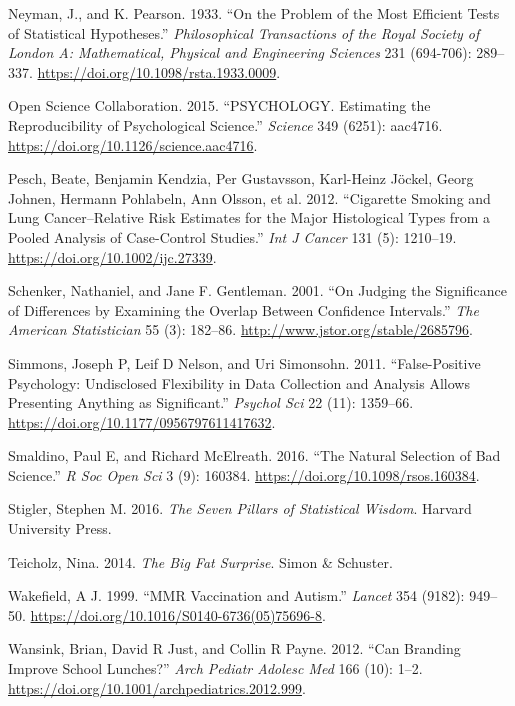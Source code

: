 \documentclass[
  12pt,
]{book}
\newlength{\cslhangindent}
\newlength{\cslentryspacingunit} %
\newenvironment{CSLReferences}[2] %
 {%
  \setlength{\parindent}{0pt}
  \ifodd #1
  \let\oldpar\par
  \def\par{\hangindent=\cslhangindent\oldpar}
  \fi
  \setlength{\parskip}{#2\cslentryspacingunit}
 }%
 {}
\begin{document}
\begin{CSLReferences}{1}{0}
\leavevmode{}%
Neyman, J., and K. Pearson. 1933. {``On the Problem of the Most Efficient Tests of Statistical Hypotheses.''} \emph{Philosophical Transactions of the Royal Society of London A: Mathematical, Physical and Engineering Sciences} 231 (694-706): 289--337. \url{https://doi.org/10.1098/rsta.1933.0009}.

\leavevmode{}%
Open Science Collaboration. 2015. {``PSYCHOLOGY. Estimating the Reproducibility of Psychological Science.''} \emph{Science} 349 (6251): aac4716. \url{https://doi.org/10.1126/science.aac4716}.

\leavevmode{}%
Pesch, Beate, Benjamin Kendzia, Per Gustavsson, Karl-Heinz Jöckel, Georg Johnen, Hermann Pohlabeln, Ann Olsson, et al. 2012. {``Cigarette Smoking and Lung Cancer--Relative Risk Estimates for the Major Histological Types from a Pooled Analysis of Case-Control Studies.''} \emph{Int J Cancer} 131 (5): 1210--19. \url{https://doi.org/10.1002/ijc.27339}.

\leavevmode{}%
Schenker, Nathaniel, and Jane F. Gentleman. 2001. {``On Judging the Significance of Differences by Examining the Overlap Between Confidence Intervals.''} \emph{The American Statistician} 55 (3): 182--86. \url{http://www.jstor.org/stable/2685796}.

\leavevmode{}%
Simmons, Joseph P, Leif D Nelson, and Uri Simonsohn. 2011. {``False-Positive Psychology: Undisclosed Flexibility in Data Collection and Analysis Allows Presenting Anything as Significant.''} \emph{Psychol Sci} 22 (11): 1359--66. \url{https://doi.org/10.1177/0956797611417632}.

\leavevmode{}%
Smaldino, Paul E, and Richard McElreath. 2016. {``The Natural Selection of Bad Science.''} \emph{R Soc Open Sci} 3 (9): 160384. \url{https://doi.org/10.1098/rsos.160384}.

\leavevmode{}%
Stigler, Stephen M. 2016. \emph{The Seven Pillars of Statistical Wisdom}. Harvard University Press.

\leavevmode{}%
Teicholz, Nina. 2014. \emph{The Big Fat Surprise}. Simon \& Schuster.

\leavevmode{}%
Wakefield, A J. 1999. {``MMR Vaccination and Autism.''} \emph{Lancet} 354 (9182): 949--50. \url{https://doi.org/10.1016/S0140-6736(05)75696-8}.

\leavevmode{}%
Wansink, Brian, David R Just, and Collin R Payne. 2012. {``Can Branding Improve School Lunches?''} \emph{Arch Pediatr Adolesc Med} 166 (10): 1--2. \url{https://doi.org/10.1001/archpediatrics.2012.999}.

\end{CSLReferences}
\end{document}
